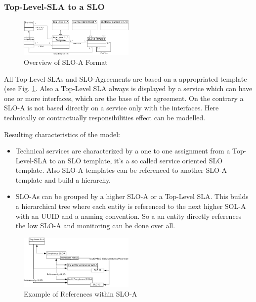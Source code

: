 \subsubsection{Top-Level-SLA to a SLO}
\begin{figure}[ht]
		\centering
\includegraphics[width=0.5\textwidth]{fig/sloa_arch_allg.png}
\caption{Overview of SLO-A Format}
\label{fig:overview_sloa}
\end{figure}
All Top-Level SLAs and SLO-Agreements are based on a appropriated template (see Fig. \ref{fig:overview_sloa}. Also a Top-Level SLA always is displayed by a service which can have one or more interfaces, which are the base of the agreement. On the contrary a SLO-A is not based directly on a service only with the interfaces. Here technically or contractually responsibilities effect can be modelled.

Resulting characteristics of the model:
\begin{itemize}
\item Technical services are characterized by a one to one assignment from a Top-Level-SLA to an SLO template, it's a so called service oriented SLO template. Also SLO-A templates can be referenced to another SLO-A template and build a hierarchy.
\item SLO-As can be grouped by a higher SLO-A or a Top-Level SLA. This builds a hierarchical tree where each entity is referenced to the next higher SOL-A with an UUID and a naming convention. So a an entity directly references the low SLO-A and monitoring can be done over all. 
\end{itemize}
\begin{figure}[ht]
		\centering
\includegraphics[width=0.5\textwidth]{fig/sloa_arch_refs.png}
\caption{Example of References within SLO-A}
\label{fig:example_sloa}
\end{figure}

